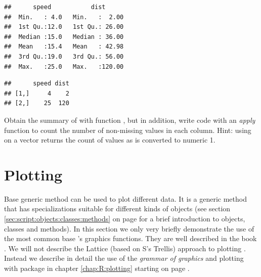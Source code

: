 \documentclass[krantz2]{krantz}\usepackage{knitr}%
\begin{document}
\begin{knitrout}\footnotesize
{}\color{fgcolor}\begin{kframe}
\begin{alltt}
\end{alltt}
\begin{verbatim}
##      speed           dist       
##  Min.   : 4.0   Min.   :  2.00  
##  1st Qu.:12.0   1st Qu.: 26.00  
##  Median :15.0   Median : 36.00  
##  Mean   :15.4   Mean   : 42.98  
##  3rd Qu.:19.0   3rd Qu.: 56.00  
##  Max.   :25.0   Max.   :120.00
\end{verbatim}
\begin{alltt}
\end{alltt}
\begin{verbatim}
##      speed dist
## [1,]     4    2
## [2,]    25  120
\end{verbatim}
\end{kframe}
\end{knitrout}

\begin{advplayground}
Obtain the summary of  with function , but in addition, write code with an \emph{apply} function to count the number of non-missing values in each column. Hint: using  on a  vector returns the count of  values as  is converted to numeric 1.
\end{advplayground}

\section{Plotting}
Base \Rlang generic method  can be used to plot different data. It is a generic method that has specializations suitable for different kinds of objects (see section \ref{sec:script:objects:classes:methods} on page \pageref{sec:script:objects:classes:methods} for a brief introduction to objects, classes and methods). In this section we only very briefly demonstrate the use of the most common base 's graphics functions. They are well described in the book  \autocite{Murrell2011}. We will not describe the Lattice (based on S's Trellis) approach to plotting \autocite{Sarkar2008}. Instead we describe in detail the use of the \emph{grammar of graphics} and plotting with package \ggplot in chapter \ref{chap:R:plotting} starting on page \pageref{chap:R:plotting}.
\end{document}
